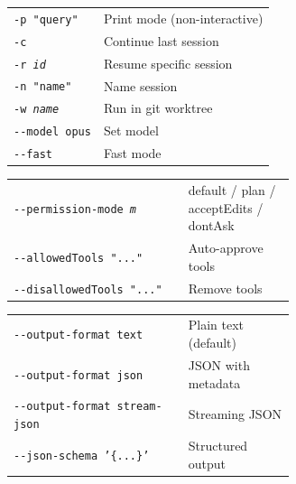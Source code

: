\documentclass[10pt]{extarticle}
\begin{document}
\begin{multicols}{2}

\begin{tabularx}{\linewidth}{@{}l@{\enspace}Y@{}}
\texttt{-p "query"}                  & Print mode (non-interactive) \\
\texttt{-c}                          & Continue last session \\
\texttt{-r \textit{id}}             & Resume specific session \\
\texttt{-n "name"}                   & Name session \\
\texttt{-w \textit{name}}           & Run in git worktree \\
\texttt{-{}-model opus}             & Set model \\
\texttt{-{}-fast}                    & Fast mode \\
\end{tabularx}

\begin{tabularx}{\linewidth}{@{}>{\raggedright\arraybackslash}p{0.62\linewidth}@{\enspace}Y@{}}
\texttt{-{}-permission-mode \textit{m}} & default / plan / acceptEdits / dontAsk \\
\texttt{-{}-allowedTools "..."}      & Auto-approve tools \\
\texttt{-{}-disallowedTools "..."}   & Remove tools \\
\end{tabularx}

\begin{tabularx}{\linewidth}{@{}>{\raggedright\arraybackslash}p{0.62\linewidth}@{\enspace}Y@{}}
\texttt{-{}-output-format text}      & Plain text (default) \\
\texttt{-{}-output-format json}      & JSON with metadata \\
\texttt{-{}-output-format stream-json} & Streaming JSON \\
\texttt{-{}-json-schema '\{...\}'}  & Structured output \\
\end{tabularx}


\end{multicols}
\end{document}
